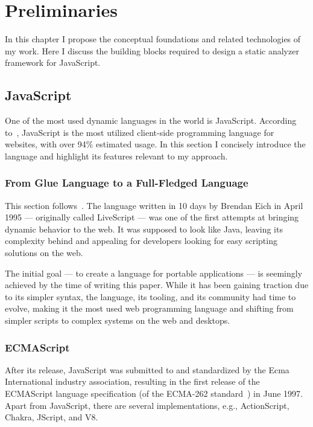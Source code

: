 \chapter{Preliminaries}
\label{chap:preliminaries}

In this chapter I propose the conceptual foundations and related technologies of my work. Here I discuss the building blocks required to design a static analyzer framework for JavaScript.

\section{JavaScript}
One of the most used dynamic languages in the world is JavaScript. According to~\cite{js-usage}, JavaScript is the most utilized client-side programming language for websites, with over 94\% estimated usage. In this section I concisely introduce the language and highlight its features relevant to my approach.

\subsection{From Glue Language to a Full-Fledged Language}
This section follows~\cite{10.1109/MC.2012.57}. The language written in 10 days by Brendan Eich in April 1995 --- originally called LiveScript --- was one of the first attempts at bringing dynamic behavior to the web. It was supposed to look like Java, leaving its complexity behind and appealing for developers looking for easy scripting solutions on the web.

The initial goal --- to create a language for portable applications --- is seemingly achieved by the time of writing this paper. While it has been gaining traction due to its simpler syntax, the language, its tooling, and its community had time to evolve, making it the most used web programming language and shifting from simpler scripts to complex systems on the web and desktops.

\subsection{ECMAScript}
After its release, JavaScript was submitted to and standardized by the Ecma International industry association, resulting in the first release of the ECMAScript language specification (of the ECMA-262 standard~\cite{ecma-262}) in June 1997. Apart from JavaScript, there are several implementations, e.g., ActionScript, Chakra, JScript, and V8.

